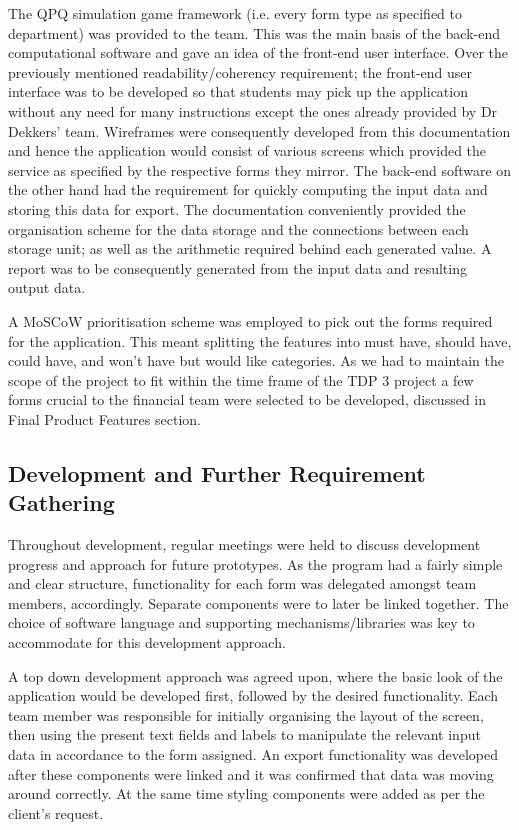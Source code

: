 \documentclass{l3proj}
\begin{document}
The QPQ simulation game framework (i.e. every form type as specified to department) was provided to the team. This was the main basis of the back-end computational software and gave an idea of the front-end user interface. Over the previously mentioned readability/coherency requirement; the front-end user interface was to be developed so that students may pick up the application without any need for many instructions except the ones already provided by Dr Dekkers' team. Wireframes were consequently developed from this documentation and hence the application would consist of various screens which provided the service as specified by the respective forms they mirror. The back-end software on the other hand had the requirement for quickly computing the input data and storing this data for export. The documentation conveniently provided the organisation scheme for the data storage and the connections between each storage unit; as well as the arithmetic required behind each generated value. A report was to be consequently generated from the input data and resulting output data.
    
A MoSCoW prioritisation scheme was employed to pick out the forms required for the application. This meant splitting the features into must have, should have, could have, and won't have but would like categories. As we had to maintain the scope of the project to fit within the time frame of the TDP 3 project a few forms crucial to the financial team were selected to be developed, discussed in Final Product Features section.

\subsection{Development and Further Requirement Gathering}
Throughout development, regular meetings were held to discuss development progress and approach for future prototypes. As the program had a fairly simple and clear structure, functionality for each form was delegated amongst team members, accordingly. Separate components were to later be linked together. The choice of software language and supporting mechanisms/libraries was key to accommodate for this development approach.

A top down development approach was agreed upon, where the basic look of the application would be developed first, followed by the desired functionality. Each team member was responsible for initially organising the layout of the screen, then using the present text fields and labels to manipulate the relevant input data in accordance to the form assigned. An export functionality was  developed after these components were linked and it was confirmed that data was moving around correctly. At the same time styling components were added as per the client's request.
\end{document}
